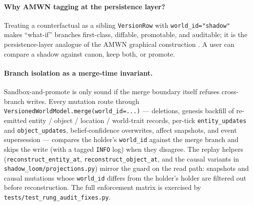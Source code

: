 \documentclass[11pt]{article}
\begin{document}
\paragraph{Why AMWN tagging at the persistence layer?}
Treating a counterfactual as a sibling \texttt{VersionRow} with
\texttt{world\_id="shadow"} makes ``what-if'' branches first-class,
diffable, promotable, and auditable; it is the persistence-layer
analogue of the AMWN graphical construction
\citep{correa2025amwn}. A user can compare a shadow against canon,
keep both, or promote.

\paragraph{Branch isolation as a merge-time invariant.}
Sandbox-and-promote is only sound if the merge boundary itself
refuses cross-branch writes. Every mutation route through
\texttt{VersionedWorldModel.merge(world\_id=...)} ---
deletions, genesis backfill of re-emitted entity / object /
location / world-trait records, per-tick \texttt{entity\_updates}
and \texttt{object\_updates}, belief-confidence overwrites,
affect snapshots, and event supersession --- compares the
holder's \texttt{world\_id} against the merge branch and skips
the write (with a tagged \texttt{INFO} log) when they
disagree. The replay helpers
(\texttt{reconstruct\_entity\_at}, \texttt{reconstruct\_object\_at},
and the causal variants in \texttt{shadow\_loom/projections.py})
mirror the guard on the read path: snapshots and causal
mutations whose \texttt{world\_id} differs from the holder's
holder are filtered out before reconstruction. The full
enforcement matrix is exercised by
\texttt{tests/test\_rung\_audit\_fixes.py}.
\end{document}
